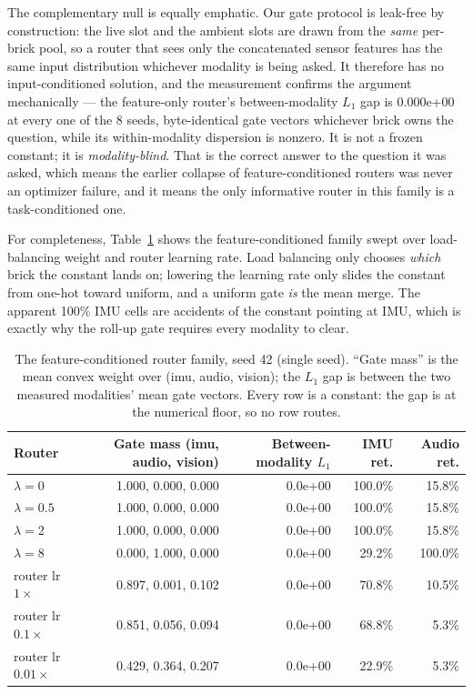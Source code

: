 \documentclass[11pt]{article}
\begin{document}
The complementary null is equally emphatic. Our gate protocol is leak-free by construction: the live slot and the ambient slots are drawn from the \emph{same} per-brick pool, so a router that sees only the concatenated sensor features has the same input distribution whichever modality is being asked. It therefore has no input-conditioned solution, and the measurement confirms the argument mechanically --- the feature-only router's between-modality $L_1$ gap is 0.000e+00 at every one of the 8 seeds, byte-identical gate vectors whichever brick owns the question, while its within-modality dispersion is nonzero. It is not a frozen constant; it is \emph{modality-blind}. That is the correct answer to the question it was asked, which means the earlier collapse of feature-conditioned routers was never an optimizer failure, and it means the only informative router in this family is a task-conditioned one.

For completeness, Table~\ref{tab:collapse} shows the feature-conditioned family swept over load-balancing weight and router learning rate. Load balancing only chooses \emph{which} brick the constant lands on; lowering the learning rate only slides the constant from one-hot toward uniform, and a uniform gate \emph{is} the mean merge. The apparent 100\% IMU cells are accidents of the constant pointing at IMU, which is exactly why the roll-up gate requires every modality to clear.

\begin{table}[t]
\centering
\caption{The feature-conditioned router family, seed 42 (single seed). ``Gate mass'' is the mean convex weight over (imu, audio, vision); the $L_1$ gap is between the two measured modalities' mean gate vectors. Every row is a constant: the gap is at the numerical floor, so no row routes.}
\label{tab:collapse}
\small
\begin{tabular}{lrrrr}
\toprule
Router & Gate mass (imu, audio, vision) & Between-modality $L_1$ & IMU ret. & Audio ret. \\
\midrule
$\lambda = 0$ & 1.000, 0.000, 0.000 & 0.0e+00 & 100.0\% & 15.8\% \\
$\lambda = 0.5$ & 1.000, 0.000, 0.000 & 0.0e+00 & 100.0\% & 15.8\% \\
$\lambda = 2$ & 1.000, 0.000, 0.000 & 0.0e+00 & 100.0\% & 15.8\% \\
$\lambda = 8$ & 0.000, 1.000, 0.000 & 0.0e+00 & 29.2\% & 100.0\% \\
router lr $1\times$ & 0.897, 0.001, 0.102 & 0.0e+00 & 70.8\% & 10.5\% \\
router lr $0.1\times$ & 0.851, 0.056, 0.094 & 0.0e+00 & 68.8\% & 5.3\% \\
router lr $0.01\times$ & 0.429, 0.364, 0.207 & 0.0e+00 & 22.9\% & 5.3\% \\
\bottomrule
\end{tabular}
\end{table}
\end{document}
